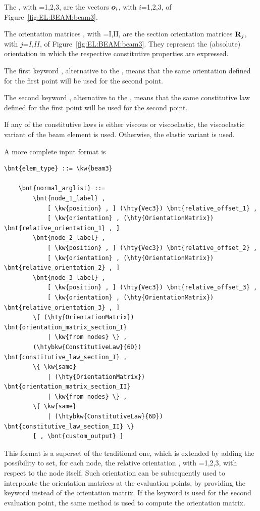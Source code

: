 The , with =1,2,3, are the vectors
$\boldsymbol{o}_i$, with $i$=1,2,3, of Figure~\ref{fig:EL:BEAM:beam3}.

The orientation matrices ,
with =I,II, are the section orientation matrices
$\bm{\mathbf R}_j$, with $j$=$I$,$II$, of Figure~\ref{fig:EL:BEAM:beam3}.
They represent the (absolute) orientation in which the respective
constitutive properties are expressed.

The first keyword , alternative to the 
, means that the same orientation
defined for the first point will be used for the second point.

The second keyword , alternative to the
, means that the same constitutive law
defined for the first point will be used for the second point.

If any of the constitutive laws is either viscous or viscoelastic,
the viscoelastic variant of the beam element is used.
Otherwise, the elastic variant is used.

A more complete input format is
\begin{Verbatim}[commandchars=\\\{\}]
    \bnt{elem_type} ::= \kw{beam3}

    \bnt{normal_arglist} ::=
        \bnt{node_1_label} ,
            [ \kw{position} , ] (\hty{Vec3}) \bnt{relative_offset_1} ,
            [ \kw{orientation} , (\hty{OrientationMatrix}) \bnt{relative_orientation_1} , ]
        \bnt{node_2_label} ,
            [ \kw{position} , ] (\hty{Vec3}) \bnt{relative_offset_2} ,
            [ \kw{orientation} , (\hty{OrientationMatrix}) \bnt{relative_orientation_2} , ]
        \bnt{node_3_label} ,
            [ \kw{position} , ] (\hty{Vec3}) \bnt{relative_offset_3} ,
            [ \kw{orientation} , (\hty{OrientationMatrix}) \bnt{relative_orientation_3} , ]
        \{ (\hty{OrientationMatrix}) \bnt{orientation_matrix_section_I}
            | \kw{from nodes} \} ,
        (\htybkw{ConstitutiveLaw}{6D}) \bnt{constitutive_law_section_I} ,
        \{ \kw{same}
            | (\hty{OrientationMatrix}) \bnt{orientation_matrix_section_II}
            | \kw{from nodes} \} ,
        \{ \kw{same}
            | (\htybkw{ConstitutiveLaw}{6D}) \bnt{constitutive_law_section_II} \}
        [ , \bnt{custom_output} ]
\end{Verbatim}
This format is a superset of the traditional one, which is extended
by adding the possibility to set, for each node, the relative orientation
, with =1,2,3,
with respect to the node itself.
Such orientation can be subsequently used to interpolate the orientation matrices
at the evaluation points, by providing the keyword 
instead of the orientation matrix.
If the keyword  is used for the second evaluation point,
the same method is used to compute the orientation matrix.

